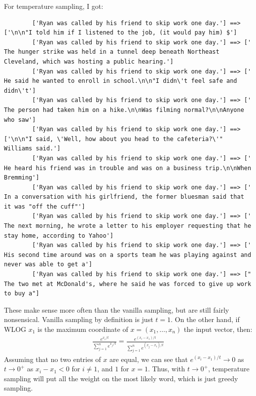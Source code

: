 \documentclass[12pt]{article}
\theoremstyle{definitionstyle}
\begin{document}
    For temperature sampling, I got:
    \begin{lstlisting}
        ['Ryan was called by his friend to skip work one day.'] ==> ['\n\n"I told him if I listened to the job, (it would pay him) $']
        ['Ryan was called by his friend to skip work one day.'] ==> [' The hunger strike was held in a tunnel deep beneath Northeast Cleveland, which was hosting a public hearing.']
        ['Ryan was called by his friend to skip work one day.'] ==> [' He said he wanted to enroll in school.\n\n"I didn\'t feel safe and didn\'t']
        ['Ryan was called by his friend to skip work one day.'] ==> [' The person had taken him on a hike.\n\nWas filming normal?\n\nAnyone who saw']
        ['Ryan was called by his friend to skip work one day.'] ==> ['\n\n"I said, \'Well, how about you head to the cafeteria?\'" Williams said.']
        ['Ryan was called by his friend to skip work one day.'] ==> [' He heard his friend was in trouble and was on a business trip.\n\nWhen Bremming']
        ['Ryan was called by his friend to skip work one day.'] ==> [' In a conversation with his girlfriend, the former bluesman said that it was "off the cuff"']
        ['Ryan was called by his friend to skip work one day.'] ==> [' The next morning, he wrote a letter to his employer requesting that he stay home, according to Yahoo']
        ['Ryan was called by his friend to skip work one day.'] ==> [' His second time around was on a sports team he was playing against and never was able to get a']
        ['Ryan was called by his friend to skip work one day.'] ==> [" The two met at McDonald's, where he said he was forced to give up work to buy a"]
    \end{lstlisting}
    These make sense more often than the vanilla sampling, but are still fairly nonsensical. Vanilla sampling by definition is just $t = 1$. On the other hand, if WLOG $x_1$ is the maximum coordinate of $x = (x_1, \ldots, x_n)$ the input vector, then:
    \begin{align*}
        \frac{e^{x_i/t}}{\sum_{j=1}^n e^{x_j/t}} = \frac{e^{(x_i-x_1)/t}}{\sum_{j=1}^n e^{(x_j-x_1)/t}}
    \end{align*}
    Assuming that no two entries of $x$ are equal, we can see that $e^{(x_i-x_1)/t} \to 0$ as $t \to 0^+$ as $x_i - x_1 < 0$ for $i \neq 1$, and $1$ for $x = 1$. Thus, with $t \to 0^+$, temperature sampling will put all the weight on the most likely word, which is just greedy sampling. 
\end{document}

